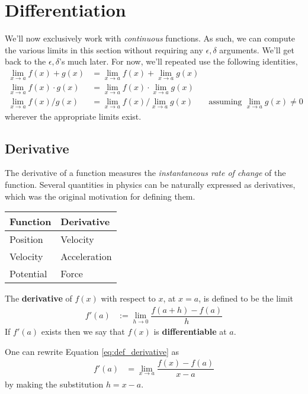 
\section{Differentiation}
\begin{remark}
	We'll now exclusively work with {\it continuous} functions. As such, we can compute the various limits in this section without requiring any $\epsilon, \delta$ arguments. We'll get back to the $\epsilon, \delta$'s much later. For now, we'll repeated use the following identities,
	\begin{align*}
		\lim \limits_{x \rightarrow a} f(x) + g(x)     & = \lim \limits_{x \rightarrow a} f(x) + \lim \limits_{x \rightarrow a} g(x)                                                                   \\
		\lim \limits_{x \rightarrow a} f(x) \cdot g(x) & = \lim \limits_{x \rightarrow a} f(x) \cdot \lim \limits_{x \rightarrow a} g(x)                                                               \\
		\lim \limits_{x \rightarrow a} f(x) / g(x)     & = \lim \limits_{x \rightarrow a} f(x) / \lim \limits_{x \rightarrow a} g(x)     & \mbox{ assuming }\lim \limits_{x \rightarrow a} g(x) \neq 0
	\end{align*}
	wherever the appropriate limits exist.
\end{remark}

\subsection{Derivative}

The derivative of a function measures the {\it instantaneous rate of change} of the function. Several quantities in physics can be naturally expressed as derivatives, which was the original motivation for defining them.
\begin{center}
	\begin{tabular}{l|l}
		Function  & Derivative   \\ \hline
		Position  & Velocity     \\
		Velocity  & Acceleration \\
		Potential & Force
	\end{tabular}
\end{center}

\begin{definition}
	The {\bf derivative} of $f(x)$ with respect to $x$, at $x=a$, is defined to be the limit
	\begin{align}
		\label{eq:def_derivative}
		f'(a)
		 & :=
		\lim \limits_{h \rightarrow 0}
		\dfrac{f(a+h) - f(a)}{h}
	\end{align}
	If $f'(a)$ exists then we say that $f(x)$ is {\bf differentiable} at $a$.
\end{definition}
One can rewrite Equation \eqref{eq:def_derivative} as
\begin{align}
	\label{eq:def_derivative2}
	f'(a)
	 & =
	\lim \limits_{x \rightarrow a}
	\dfrac{f(x) - f(a)}{x - a}
\end{align}
by making the substitution $h = x - a$.

